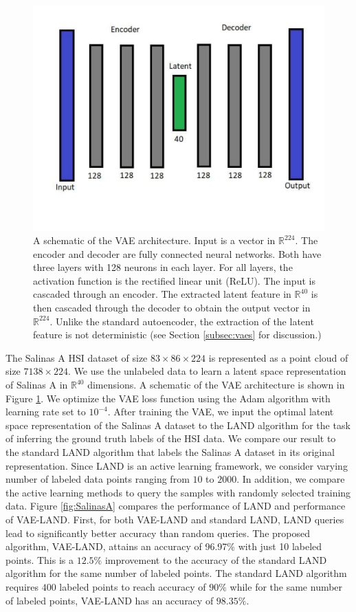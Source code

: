 \documentclass{article}
\def\R{\mathbb{R}}
\def\R{{\mathbb R}}
\begin{document}
\begin{figure}[h]
\includegraphics[clip,width=.45\textwidth,trim=1cm 3.5cm 1cm 1cm]{Images/VAE_Schematics.pdf}
\caption{\small{A schematic of the VAE architecture.  Input is a vector in $\R^{224}$. The encoder and decoder are fully connected neural networks. Both have three layers with 128 neurons in each layer. For all layers, the activation function is the rectified linear unit (ReLU).
The input is cascaded through an encoder. The extracted latent feature in $\R^{40}$ is then cascaded through the decoder to obtain the
output vector in $\R^{224}$.  Unlike the standard autoencoder, the extraction of the latent feature is not deterministic (see Section \ref{subsec:vaes} for discussion.)}}
\label{fig:vae_schematics}
\end{figure}
The Salinas A HSI dataset of size $83 \times 86\times 224$ is represented as a point cloud of size $7138\times 224$. We use the unlabeled data to learn a latent space representation of Salinas A in $\R^{40}$ dimensions. A schematic of the VAE architecture is shown in Figure \ref{fig:vae_schematics}. We optimize the VAE loss function using the Adam algorithm with learning rate set to $10^{-4}$. After training the VAE, we input the optimal latent space representation of the Salinas A dataset to the LAND algorithm for the task of inferring the ground truth labels of the HSI data. We compare our result to the standard LAND algorithm that labels the Salinas A dataset in its original representation. Since LAND is an active learning framework, we consider varying number of labeled data points ranging from $10$ to $2000$. In addition, we compare the active learning methods to query the samples with randomly selected training data. Figure \ref{fig:SalinasA} compares the performance of LAND and performance of VAE-LAND. First, for both VAE-LAND and standard LAND, LAND queries lead to significantly better accuracy than random queries. The proposed algorithm, VAE-LAND, attains an accuracy of 96.97\% with just 10 labeled points. This is a $12.5\%$ improvement to the accuracy of the standard LAND algorithm for the same number of labeled points. The standard LAND algorithm requires $400$ labeled points to reach accuracy of $90\%$ while for the same number of labeled points, VAE-LAND has an accuracy of $98.35\%$. 
\end{document}
